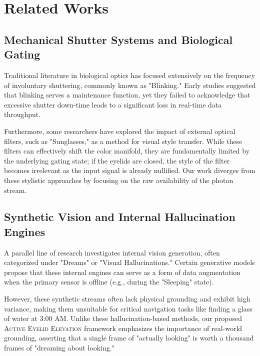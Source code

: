\section{Related Works}
\label{sec:related}

\subsection{Mechanical Shutter Systems and Biological Gating}
Traditional literature in biological optics has focused extensively on the frequency of involuntary shuttering, commonly known as "Blinking." Early studies suggested that blinking serves a maintenance function, yet they failed to acknowledge that excessive shutter down-time leads to a significant loss in real-time data throughput.

Furthermore, some researchers have explored the impact of external optical filters, such as "Sunglasses," as a method for visual style transfer. While these filters can effectively shift the color manifold, they are fundamentally limited by the underlying gating state; if the eyelids are closed, the style of the filter becomes irrelevant as the input signal is already nullified. Our work diverges from these stylistic approaches by focusing on the raw availability of the photon stream.

\subsection{Synthetic Vision and Internal Hallucination Engines}
A parallel line of research investigates internal vision generation, often categorized under "Dreams" or "Visual Hallucinations." Certain generative models propose that these internal engines can serve as a form of data augmentation when the primary sensor is offline (e.g., during the "Sleeping" state).

However, these synthetic streams often lack physical grounding and exhibit high variance, making them unsuitable for critical navigation tasks like finding a glass of water at 3:00 AM. Unlike these hallucination-based methods, our proposed \textsc{Active Eyelid Elevation} framework emphasizes the importance of real-world grounding, asserting that a single frame of "actually looking" is worth a thousand frames of "dreaming about looking."
